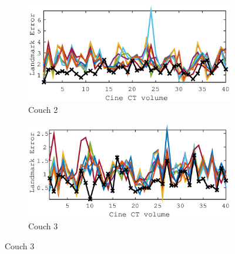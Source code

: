 \documentclass[11pt,a4paper,oneside]{report}
\begin{document}
\begin{figure}
  \begin{subfigure}[b]{0.5\textwidth}
    \includegraphics[width=\textwidth, trim=0 0 0 0,clip=true]{figures/task4/landmark_error_couch2.eps}
    \caption{Couch 2}
  \end{subfigure}%
  \begin{subfigure}[b]{0.5\textwidth}
    \includegraphics[width=\textwidth, trim=0 0 0 0,clip=true]{figures/task4/landmark_error_couch3.eps}
    \caption{Couch 3}
  \end{subfigure}%
   

\end{figure}
\end{document}
